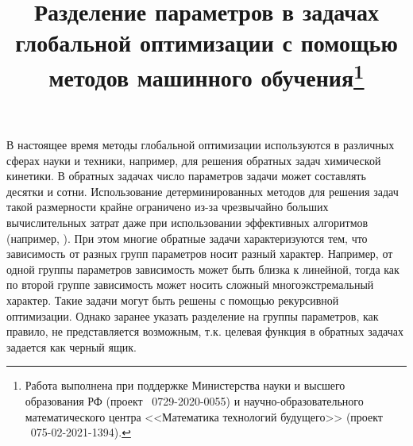 \documentclass[11pt, oneside, a4paper]{article}
\begin{document}
\setcounter{page}{1}



\title{Разделение параметров в задачах глобальной оптимизации с помощью методов машинного обучения\footnote{Работа выполнена при поддержке Министерства науки и высшего образования РФ (проект \textnumero~0729-2020-0055) и научно-образовательного математического центра <<Математика технологий будущего>> (проект \textnumero~075-02-2021-1394).}}





\bigskip

В настоящее время методы глобальной оптимизации используются в различных сферах науки и техники, например, для решения обратных задач химической кинетики. В обратных задачах число параметров задачи может составлять десятки и сотни. Использование детерминированных методов для решения задач такой размерности крайне ограничено из-за чрезвычайно больших вычислительных затрат даже при использовании эффективных алгоритмов (например, \cite{Evtushenko2009,Paulavicius2016}). 
При этом многие обратные задачи характеризуются тем, что зависимость от разных групп параметров носит разный характер. Например, от одной группы параметров зависимость может быть близка к линейной, тогда как по второй группе зависимость может носить сложный многоэкстремальный характер. Такие задачи могут быть решены с помощью рекурсивной оптимизации. Однако заранее указать разделение на группы параметров, как правило, не представляется возможным, т.к. целевая функция в обратных задачах задается как черный ящик. 
\end{document}
